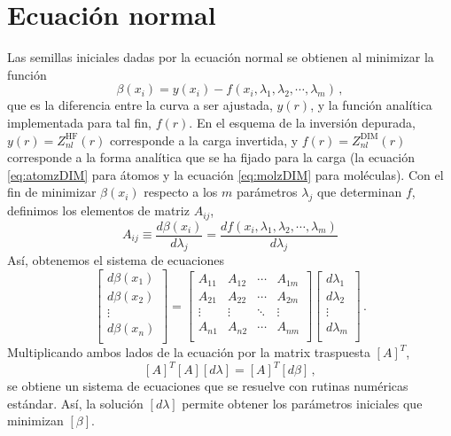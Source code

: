 \appendix

\chapter{Ecuación normal}
\label{app:ecnormal}

Las semillas iniciales dadas por la ecuación normal se obtienen al 
minimizar la función
\begin{equation}
 \beta(x_i) = y(x_i) - f(x_i,\lambda_1,\lambda_2,\cdots,\lambda_m)\,,
\end{equation}
que es la diferencia entre la curva a ser ajustada, $y(r)$, y la función
analítica implementada para tal fin, $f(r)$. En el esquema de la inversión
depurada, $y(r) = Z_{nl}^{\mathrm{HF}}(r)$ corresponde a la carga invertida,
y $f(r) = Z_{nl}^{\mathrm{DIM}}(r)$ corresponde a la forma analítica que 
se ha fijado para la carga (la ecuación \ref{eq:atomzDIM} para átomos y 
la ecuación \ref{eq:molzDIM} para moléculas). Con el fin de minimizar
$\beta(x_i)$ respecto a los $m$ parámetros $\lambda_j$ que determinan 
$f$, definimos los elementos de matriz $A_{ij}$,
\begin{equation}
  A_{ij} \equiv \frac{d\beta(x_i)}{d\lambda_j} =
 \frac{df(x_i,\lambda_1,\lambda_2,\cdots, \lambda_m)}{d\lambda_j}
\end{equation}
Así, obtenemos el sistema de ecuaciones
\begin{equation}
 \left[
 \begin{array}{c}
  d\beta(x_1) \\
  d\beta(x_2) \\
  \vdots \\
  d\beta(x_n) \\
 \end{array}
 \right] =
 \left[
 \begin{array}{cccc}
  A_{11} & A_{12} & \cdots & A_{1m} \\
  A_{21} & A_{22} & \cdots & A_{2m} \\
  \vdots & \vdots & \ddots & \vdots \\
  A_{n1} & A_{n2} & \cdots & A_{nm} \\
 \end{array}
 \right]
 \left[
 \begin{array}{c}
 d\lambda_1 \\
 d\lambda_2 \\
 \vdots \\
 d\lambda_m \\
 \end{array}
 \right] \,.
\end{equation}
Multiplicando ambos lados de la ecuación por la matrix traspuesta $[A]^{T}$,
\begin{equation}
  \left[ A \right]^T \left[ A \right]\left[ d\lambda \right] =
  \left[ A \right]^T \left[ d\beta \right]\,,
\end{equation}
se obtiene un sistema de ecuaciones que se resuelve con rutinas numéricas 
estándar. Así, la solución $[d\lambda]$ permite obtener los parámetros 
iniciales que minimizan $[\beta]$.

